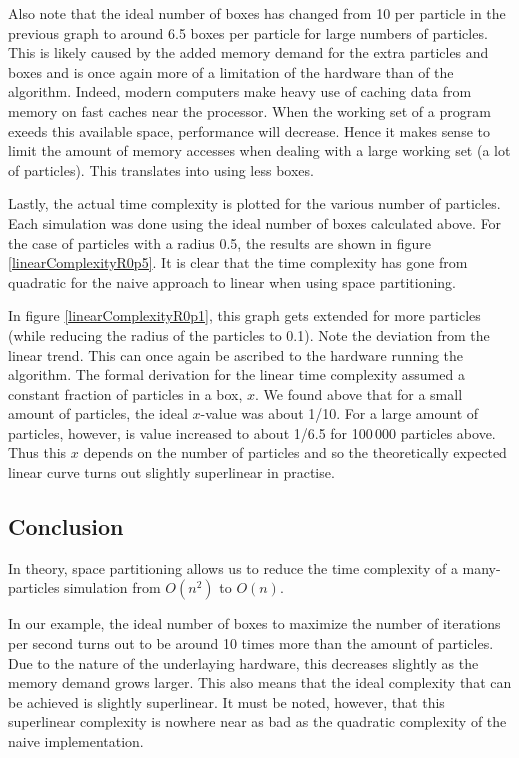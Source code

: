 Also note that the ideal number of boxes has changed from 10 per particle 
in the previous graph to around 6.5 boxes per particle for large numbers of 
particles. This is likely caused by the added memory demand for the extra 
particles and boxes and is once again more of a limitation of the hardware 
than of the algorithm. Indeed, modern computers make heavy use of caching 
data from memory on fast caches near the processor. When the working set of 
a program exeeds this available space, performance will decrease. Hence it 
makes sense to limit the amount of memory accesses when dealing with a 
large working set (a lot of particles). This translates into using less 
boxes.

Lastly, the actual time complexity is plotted for the various number of 
particles. Each simulation was done using the ideal number of boxes 
calculated above. For the case of particles with a radius 0.5, the results 
are shown in figure \ref{linearComplexityR0p5}. It is clear that the time 
complexity has gone from quadratic for the naive approach to linear when 
using space partitioning.


In figure \ref{linearComplexityR0p1}, this graph gets extended for more 
particles (while reducing the radius of the particles to 0.1). Note the 
deviation from the linear trend. This can once again be ascribed to the 
hardware running the algorithm. The formal derivation for the linear time 
complexity assumed a constant fraction of particles in a box, $x$. We found 
above that for a small amount of particles, the ideal $x$-value was about 
1/10. For a large amount of particles, however, is value increased to about 
1/6.5 for 100\,000 particles above. Thus this $x$ depends on the number of 
particles and so the theoretically expected linear curve turns out slightly 
superlinear in practise.


\subsection{Conclusion}
In theory, space partitioning allows us to reduce the time complexity of a 
many-particles simulation from $O(n^2)$ to $O(n)$.

In our example, the ideal number of boxes to maximize the number of 
iterations per second turns out to be around 10 times more than the amount 
of particles. Due to the nature of the underlaying hardware, this decreases 
slightly as the memory demand grows larger. This also means that the ideal 
complexity that can be achieved is slightly superlinear. It must be noted, 
however, that this superlinear complexity is nowhere near as bad as the 
quadratic complexity of the naive implementation.



